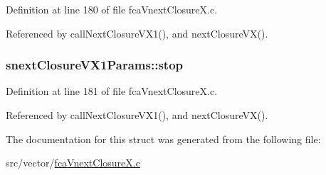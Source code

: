 \-Definition at line 180 of file fca\-Vnext\-Closure\-X.\-c.



\-Referenced by call\-Next\-Closure\-V\-X1(), and next\-Closure\-V\-X().

\hypertarget{structsnextClosureVX1Params_a4ebb2a834d87fa4bed2bb7597ac29d23}{
\subsubsection[{stop}]{ {\bf snext\-Closure\-V\-X1\-Params\-::stop}}}\label{structsnextClosureVX1Params_a4ebb2a834d87fa4bed2bb7597ac29d23}


\-Definition at line 181 of file fca\-Vnext\-Closure\-X.\-c.



\-Referenced by call\-Next\-Closure\-V\-X1(), and next\-Closure\-V\-X().



\-The documentation for this struct was generated from the following file\-:\begin{DoxyCompactItemize}
\item 
src/vector/\hyperlink{fcaVnextClosureX_8c}{fca\-Vnext\-Closure\-X.\-c}\end{DoxyCompactItemize}
